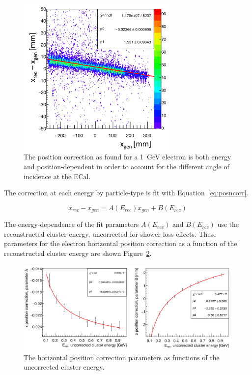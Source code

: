 \begin{figure}[H]
  \centering
      \includegraphics[width=0.7\textwidth]{pics/performance/xposn1gev.png}
  \caption[Horizontal position correction for 1~GeV electrons]{The position correction as found for a 1~GeV electron is both energy and position-dependent in order to account for the different angle of incidence at the ECal.}
  \label{Figure:xposn1gev}
\end{figure}

The correction at each energy by particle-type is fit with Equation~\eqref{eq:posncorr}. 

\begin{equation}
\label{eq:posncorr}
x_{rec} - x_{gen} = A(E_{rec}) x_{gen} + B(E_{rec})
\end{equation}

The energy-dependence of the fit parameters $A(E_{rec})$ and $B(E_{rec})$ use the reconstructed cluster energy, uncorrected for shower loss effects. These parameters for the electron horizontal position correction as a function of the reconstructed cluster energy are shown Figure~\ref{Figure:xposcorrPar}.

\begin{figure}[H]
  \centering
      \includegraphics[width=1.0\textwidth]{pics/performance/xposcorrPar.png}
  \caption[Horizontal position correction dependence for electrons]{The horizontal position correction parameters as functions of the uncorrected cluster energy.}
  \label{Figure:xposcorrPar}
\end{figure}

